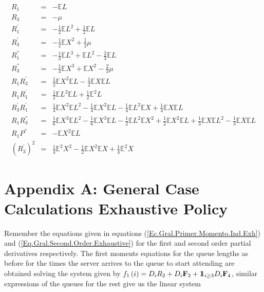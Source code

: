 \documentclass{article}
\newcommand{\esp}{\mathbb{E}}
\newcommand{\indora}{\mbox{$1$\hspace{-0.8ex}$1$}}
\begin{document}
\begin{eqnarray*}
R_{1}&=&-\esp L\\
R_{3}&=& -\mu\\
R_{1}^{'}&=&-\frac{1}{2}\esp L^{2}+\frac{1}{2}\esp L\\
R_{3}^{'}&=&-\frac{1}{2}\esp X^{2}+\frac{1}{2}\mu\\
R_{1}^{''}&=&-\frac{1}{3}\esp L^{3}+\esp L^{2}-\frac{2}{3}\esp L\\
R_{3}^{''}&=&-\frac{1}{3}\esp X^{3}+\esp X^{2}-\frac{2}{3}\mu\\
R_{1}R_{3}^{'}&=&\frac{1}{2}\esp X^{2}\esp L-\frac{1}{2}\esp X\esp L\\
R_{1}R_{1}^{'}&=&\frac{1}{2}\esp L^{2}\esp L+\frac{1}{2}\esp^{2}L\\
R_{3}^{'}R_{1}^{'}&=&\frac{1}{4}\esp X^{2}\esp L^{2}-\frac{1}{4}\esp X^{2}\esp L-\frac{1}{4}\esp L^{2}\esp X+\frac{1}{4}\esp X\esp L\\
R_{1}R_{3}^{''}&=&\frac{1}{6}\esp X^{3}\esp L^{2}-\frac{1}{6}\esp X^{3}\esp L-\frac{1}{2}\esp L^{2}\esp X^{2}+\frac{1}{2}\esp X^{2}\esp L+\frac{1}{3}\esp X\esp L^{2}-\frac{1}{3}\esp X\esp L\\
R_{1}P^{''}&=&-\esp X^{2}\esp L\\
\left(R_{3}^{'}\right)^{2}&=&\frac{1}{4}\esp^{2}X^{2}-\frac{1}{2}\esp X^{2}\esp X+\frac{1}{4}\esp^{2} X
\end{eqnarray*}









\newpage
\section{Appendix A: General Case Calculations Exhaustive Policy}\label{Secc.Append.B}



Remember the equations given in equations (\ref{Ec.Gral.Primer.Momento.Ind.Exh}) and (\ref{Eq.Gral.Second.Order.Exhaustive}) for the first and second order partial derivatives respectively. The first moments equations for the queue lengths as before for the times the server arrives to the queue to start attending are obtained solving the system given by $f_{1}\left(i\right)=D_{i}R_{2}+D_{i}\mathbf{F}_{2}+\indora_{i\geq3}D_{i}\mathbf{F}_{4}$, similar expressions of the queues for the rest give us the linear system
\end{document}

